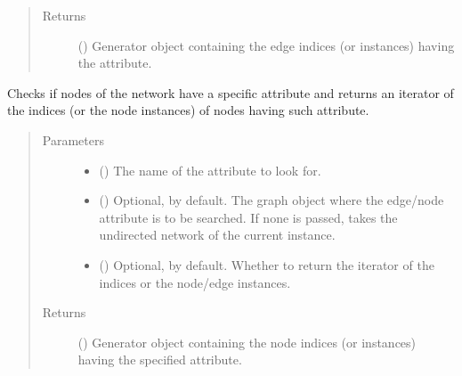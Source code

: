 \documentclass[letterpaper,10pt,english]{sphinxmanual}
\begin{document}
\begin{fulllineitems}
\begin{fulllineitems}
\begin{quote}
\begin{description}
\begin{itemize}
\end{itemize}

\item[{Returns}] \leavevmode
() \textendash{} Generator object containing the edge
indices (or instances) having the  attribute.

\end{description}\end{quote}

\end{fulllineitems}


\begin{fulllineitems}
\label{\detokenize{reference:pypath.main.PyPath.having_vattr}}
Checks if nodes of the network have a specific attribute and
returns an iterator of the indices (or the node instances) of
nodes having such attribute.
\begin{quote}\begin{description}
\item[{Parameters}] \leavevmode\begin{itemize}
\item {} 
 () \textendash{} The name of the attribute to look for.

\item {} 
 () \textendash{} Optional,  by default. The graph object where the
edge/node attribute is to be searched. If none is passed,
takes the undirected network of the current instance.

\item {} 
 () \textendash{} Optional,  by default. Whether to return the
iterator of the indices or the node/edge instances.

\end{itemize}

\item[{Returns}] \leavevmode
() \textendash{} Generator object containing the node
indices (or instances) having the specified attribute.


\end{description}
\end{quote}
\end{fulllineitems}
\end{fulllineitems}
\end{document}
